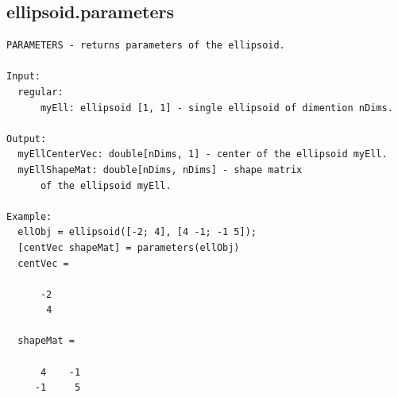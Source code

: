 \documentclass[letterpaper,10pt,english]{sphinxmanual}
\begin{document}
\subsection{ellipsoid.parameters}
\label{chap_functions:ellipsoid-parameters}
\begin{Verbatim}[commandchars=\\\{\}]
PARAMETERS - returns parameters of the ellipsoid.

Input:
  regular:
      myEll: ellipsoid [1, 1] - single ellipsoid of dimention nDims.

Output:
  myEllCenterVec: double[nDims, 1] - center of the ellipsoid myEll.
  myEllShapeMat: double[nDims, nDims] - shape matrix
      of the ellipsoid myEll.

Example:
  ellObj = ellipsoid([-2; 4], [4 -1; -1 5]);
  [centVec shapeMat] = parameters(ellObj)
  centVec =

      -2
       4

  shapeMat =

      4    -1
     -1     5
\end{Verbatim}
\end{document}
